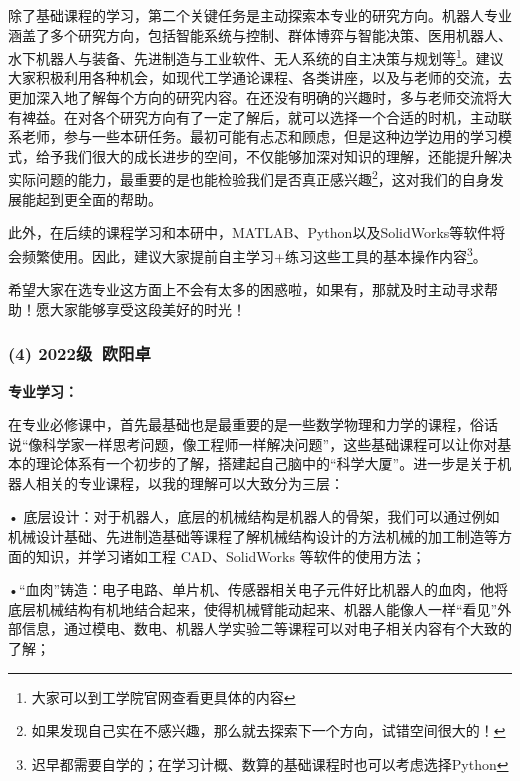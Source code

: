\documentclass[11pt,oneside]{book}
\begin{document}
\vspace{10pt}

除了基础课程的学习，第二个关键任务是主动探索本专业的研究方向。机器人专业涵盖了多个研究方向，包括智能系统与控制、群体博弈与智能决策、医用机器人、水下机器人与装备、先进制造与工业软件、无人系统的自主决策与规划等\footnote{大家可以到工学院官网查看更具体的内容}。建议大家积极利用各种机会，如现代工学通论课程、各类讲座，以及与老师的交流，去更加深入地了解每个方向的研究内容。在还没有明确的兴趣时，多与老师交流将大有裨益。在对各个研究方向有了一定了解后，就可以选择一个合适的时机，主动联系老师，参与一些本研任务。最初可能有忐忑和顾虑，但是这种边学边用的学习模式，给予我们很大的成长进步的空间，不仅能够加深对知识的理解，还能提升解决实际问题的能力，最重要的是也能检验我们是否真正感兴趣\footnote{如果发现自己实在不感兴趣，那么就去探索下一个方向，试错空间很大的！}，这对我们的自身发展能起到更全面的帮助。

\vspace{10pt}

此外，在后续的课程学习和本研中，MATLAB、Python以及SolidWorks等软件将会频繁使用。因此，建议大家提前自主学习+练习这些工具的基本操作内容\footnote{迟早都需要自学的；在学习计概、数算的基础课程时也可以考虑选择Python}。

\vspace{10pt}

希望大家在选专业这方面上不会有太多的困惑啦，如果有，那就及时主动寻求帮助！愿大家能够享受这段美好的时光！

\subsubsection{ (4) 2022级\ 欧阳卓}
\textbf{专业学习：}

在专业必修课中，首先最基础也是最重要的是一些数学物理和力学的课程，俗话说“像科学家一样思考问题，像工程师一样解决问题”，这些基础课程可以让你对基本的理论体系有一个初步的了解，搭建起自己脑中的“科学大厦”。进一步是关于机器人相关的专业课程，以我的理解可以大致分为三层：

\vspace{10pt}

• 底层设计：对于机器人，底层的机械结构是机器人的骨架，我们可以通过例如机械设计基础、先进制造基础等课程了解机械结构设计的方法机械的加工制造等方面的知识，并学习诸如工程 CAD、SolidWorks 等软件的使用方法；

\vspace{10pt}

•“血肉”铸造：电子电路、单片机、传感器相关电子元件好比机器人的血肉，他将底层机械结构有机地结合起来，使得机械臂能动起来、机器人能像人一样“看见”外部信息，通过模电、数电、机器人学实验二等课程可以对电子相关内容有个大致的了解；
\end{document}
